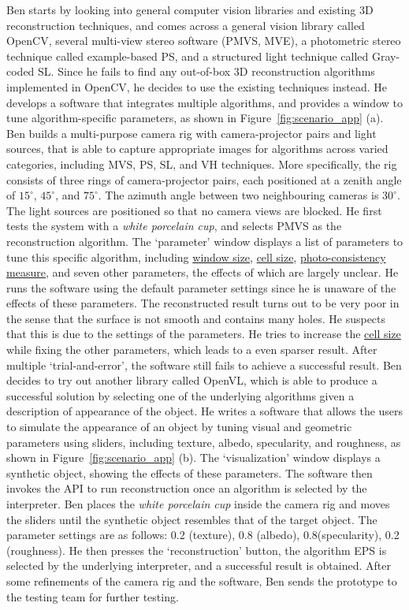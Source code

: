 Ben starts by looking into general computer vision libraries and existing 3D reconstruction techniques, and comes across a general vision library called OpenCV, several multi-view stereo software (PMVS, MVE), a photometric stereo technique called example-based PS, and a structured light technique called Gray-coded SL. Since he fails to find any out-of-box 3D reconstruction algorithms implemented in OpenCV, he decides to use the existing techniques instead. He develops a software that integrates multiple algorithms, and provides a window to tune algorithm-specific parameters, as shown in Figure~\ref{fig:scenario_app} (a). Ben builds a multi-purpose camera rig with camera-projector pairs and light sources, that is able to capture appropriate images for algorithms across varied categories, including MVS, PS, SL, and VH techniques. More specifically, the rig consists of three rings of camera-projector pairs, each positioned at a zenith angle of $15^\circ$, $45^\circ$, and $75^\circ$. The azimuth angle between two neighbouring cameras is $30^\circ$. The light sources are positioned so that no camera views are blocked. He first tests the system with a \textit{white porcelain cup}, and selects PMVS as the reconstruction algorithm. The `parameter' window displays a list of parameters to tune this specific algorithm, including \underline{window size}, \underline{cell size}, \underline{photo-consistency measure}, and seven other parameters, the effects of which are largely unclear. He runs the software using the default parameter settings since he is unaware of the effects of these parameters. The reconstructed result turns out to be very poor in the sense that the surface is not smooth and contains many holes. He suspects that this is due to the settings of the parameters. He tries to increase the \underline{cell size} while fixing the other parameters, which leads to a even sparser result. After multiple `trial-and-error', the software still fails to achieve a successful result. Ben decides to try out another library called OpenVL, which is able to produce a successful solution by selecting one of the underlying algorithms given a description of appearance of the object. He writes a software that allows the users to simulate the appearance of an object by tuning visual and geometric parameters using sliders, including texture, albedo, specularity, and roughness, as shown in Figure~\ref{fig:scenario_app} (b). The `visualization' window displays a synthetic object, showing the effects of these parameters. The software then invokes the API to run reconstruction once an algorithm is selected by the interpreter. Ben places the \textit{white porcelain cup} inside the camera rig and moves the sliders until the synthetic object resembles that of the target object. The parameter settings are as follows: 0.2 (texture), 0.8 (albedo), 0.8(specularity), 0.2 (roughness). He then presses the `reconstruction' button, the algorithm EPS is selected by the underlying interpreter, and a successful result is obtained. After some refinements of the camera rig and the software, Ben sends the prototype to the testing team for further testing.

